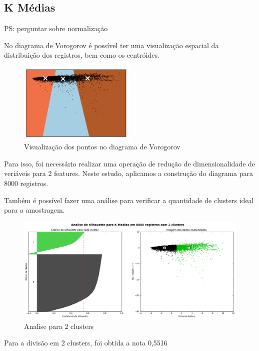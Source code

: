 \subsection{K Médias}

PS: perguntar sobre normalização

No diagrama de Vorogorov é possível ter uma visualização espacial da distribuição dos registros, bem como os centróides.

\begin{figure}[!ht]
\caption{Visualização dos pontos no diagrama de Vorogorov }
\centerline{\includegraphics[width=0.5\textwidth]{img/voronoi}}
\end{figure}

 Para isso, foi necessário realizar uma operação de redução de dimensionalidade de veriáveis para 2 features. Neste estudo, aplicamos a construção do diagrama para 8000 registros.


Também é possível fazer uma análise para verificar a quantidade de clusters ideal para a amostragem.

\begin{figure}[!ht]
\caption{Analise para 2 clusters }
\centerline{\includegraphics[width=1\textwidth]{img/silhoute2}}
\end{figure}

Para a divisão em 2 clusters, foi obtida a nota 0,5516

